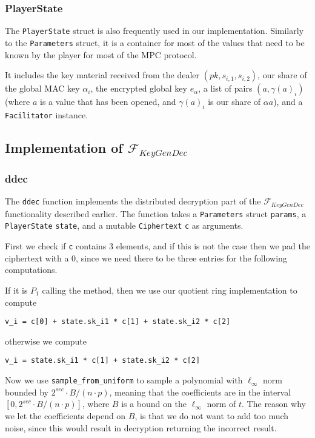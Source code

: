 \documentclass[../main.tex]{subfiles}
\begin{document}
\subsubsection{PlayerState}

The \lstinline{PlayerState} struct is also frequently used in our implementation. Similarly to the \lstinline{Parameters} struct, it is a container for most of the values that need to be known by the player for most of the MPC protocol.

It includes the key material received from the dealer $(pk, s_{i,1}, s_{i,2})$, our share of the global MAC key $\alpha_i$, the encrypted global key $e_\alpha$, a list of pairs $(a, \gamma(a)_i)$ (where $a$ is a value that has been opened, and $\gamma(a)_i$ is our share of $\alpha a$), and a \lstinline{Facilitator} instance.

\subsection{Implementation of $\mathcal{F}_{KeyGenDec}$}
\subsubsection*{ddec}
The \lstinline{ddec} function implements the distributed decryption part of the $\mathcal{F}_{KeyGenDec}$ functionality described earlier. The function takes a \lstinline{Parameters} struct \lstinline{params}, a \lstinline{PlayerState} \lstinline{state}, and a mutable \lstinline{Ciphertext} \lstinline{c} as arguments.

First we check if \lstinline{c} contains $3$ elements, and if this is not the case then we pad the ciphertext with a $0$, since we need there to be three entries for the following computations.

If it is $P_1$ calling the method, then we use our quotient ring implementation to compute
\begin{center}
    \lstinline{v_i = c[0] + state.sk_i1 * c[1] + state.sk_i2 * c[2]}
\end{center}
otherwise we compute
\begin{center}
    \lstinline{v_i = state.sk_i1 * c[1] + state.sk_i2 * c[2]}
\end{center}

Now we use \lstinline{sample_from_uniform} to sample a polynomial with $\ell_\infty$ norm bounded by $2^{sec} \cdot B/(n \cdot p)$, meaning that the coefficients are in the interval $[0, 2^{sec} \cdot B/(n \cdot p)]$, where $B$ is a bound on the $\ell_\infty$ norm of $t$.
The reason why we let the coefficients depend on $B$, is that we do not want to add too much noise, since this would result in decryption returning the incorrect result.
\end{document}
